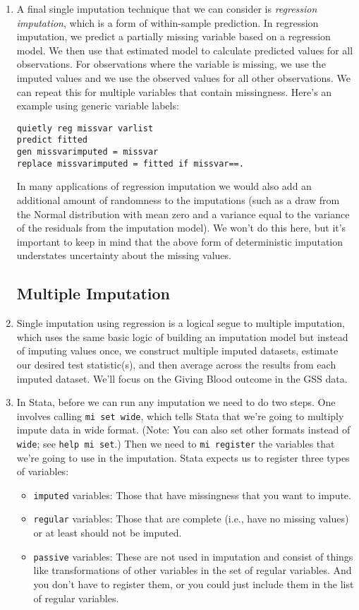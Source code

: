 \documentclass[a4paper,12pt]{article}
\begin{document}
\begin{enumerate}
\item A final single imputation technique that we can consider is {\em regression imputation}, which is a form of within-sample prediction. In regression imputation, we predict a partially missing variable based on a regression model. We then use that estimated model to calculate predicted values for all observations. For observations where the variable is missing, we use the imputed values and we use the observed values for all other observations. We can repeat this for multiple variables that contain missingness. Here's an example using generic variable labels:
\begin{verbatim}
quietly reg missvar varlist
predict fitted
gen missvarimputed = missvar
replace missvarimputed = fitted if missvar==.
\end{verbatim}

In many applications of regression imputation we would also add an additional amount of randomness to the imputations (such as a draw from the Normal distribution with mean zero and a variance equal to the variance of the residuals from the imputation model). We won't do this here, but it's important to keep in mind that the above form of deterministic imputation understates uncertainty about the missing values.

\subsection*{Multiple Imputation}

\item Single imputation using regression is a logical segue to multiple imputation, which uses the same basic logic of building an imputation model but instead of imputing values once, we construct multiple imputed datasets, estimate our desired test statistic(s), and then average across the results from each imputed dataset. We'll focus on the Giving Blood outcome in the GSS data. 

\item In Stata, before we can run any imputation we need to do two steps. One involves calling \texttt{mi set wide}, which tells Stata that we're going to multiply impute data in wide format. (Note: You can also set other formats instead of \texttt{wide}; see \texttt{help mi set}.) Then we need to \texttt{mi register} the variables that we're going to use in the imputation. Stata expects us to register three types of variables:
	\begin{itemize}
	\item \texttt{imputed} variables: Those that have missingness that you want to impute.
	\item \texttt{regular} variables: Those that are complete (i.e., have no missing values) or at least should not be imputed.
	\item \texttt{passive} variables: These are not used in imputation and consist of things like transformations of other variables in the set of regular variables. And you don't have to register them, or you could just include them in the list of regular variables.
	\end{itemize}


\end{enumerate}
\end{document}
